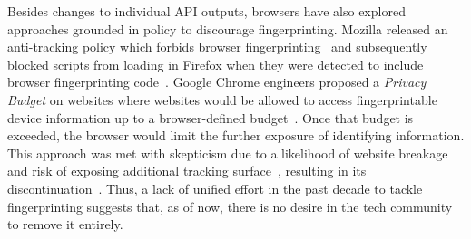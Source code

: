 Besides changes to individual API outputs, browsers have also explored approaches grounded in policy to discourage fingerprinting. 
%
Mozilla released an anti-tracking policy which forbids browser fingerprinting~\cite{mozillaSecurityTrackingPolicy2019} and subsequently blocked scripts from loading in Firefox when they were detected to include browser fingerprinting code~\cite{englehardtFirefox72Blocks2020}. 
%
Google Chrome engineers proposed a \textit{Privacy Budget} on websites where websites would be allowed to access fingerprintable device information up to a browser-defined budget~\cite{lasseyMikewestPrivacybudget2019}.
%
Once that budget is exceeded, the browser would limit the further exposure of identifying information. 
%
This approach was met with skepticism due to a likelihood of website breakage and risk of exposing additional tracking surface~\cite{snyderBraveFingerprintingPrivacy2019, rescorlaTechnicalCommentsPrivacy2021}, resulting in its discontinuation~\cite{leflerWhatHappenedPrivacy2024}. 
%
Thus, a lack of unified effort in the past decade to tackle fingerprinting suggests that, as of now, there is no desire in the tech community to remove it entirely. 